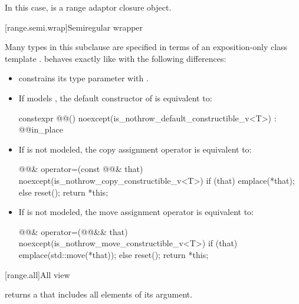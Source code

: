 In this case,  is a range adaptor
closure object.

[range.semi.wrap]{Semiregular wrapper}

\pnum
Many types in this subclause are specified in terms of
an exposition-only class template .
 behaves exactly like 
with the following differences:

\begin{itemize}
\item {} constrains
its type parameter  with
.

\item If  models , the default
constructor of  is equivalent to:
\begin{codeblock}
constexpr @@() noexcept(is_nothrow_default_constructible_v<T>)
  : @@{in_place}
{ }
\end{codeblock}

\item If  is not
modeled, the copy assignment operator is equivalent to:
\begin{codeblock}
@@& operator=(const @@& that)
  noexcept(is_nothrow_copy_constructible_v<T>)
{
  if (that) emplace(*that);
  else reset();
  return *this;
}
\end{codeblock}

\item If  is not modeled,
the move assignment operator is equivalent to:
\begin{codeblock}
@@& operator=(@@&& that)
  noexcept(is_nothrow_move_constructible_v<T>)
{
  if (that) emplace(std::move(*that));
  else reset();
  return *this;
}
\end{codeblock}
\end{itemize}

[range.all]{All view}

\pnum
{} returns a  that includes all elements of
its  argument.


